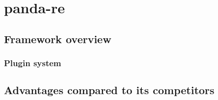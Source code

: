 \chapter{panda-re}

\section{Framework overview}

\subsection{Plugin system}

\section{Advantages compared to its competitors}


